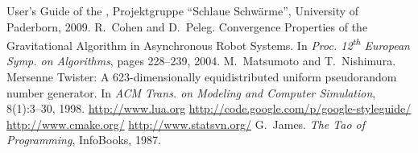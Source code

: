 \begin{thebibliography}{99.}
	User's Guide of the \RSS,
	Projektgruppe ``Schlaue Schwärme'',
	University of Paderborn,
	2009.
	R.~Cohen and D.~Peleg.
        Convergence Properties of the Gravitational Algorithm in Asynchronous Robot Systems.
        In \textit{Proc. 12\textsuperscript{th} European Symp. on Algorithms},
        pages 228--239,
        2004.
	M.~Matsumoto and T.~Nishimura. 
	Mersenne Twister: A 623-dimensionally equidistributed uniform pseudorandom number generator.
	In \textit{ACM Trans. on Modeling and Computer Simulation}, 8(1):3--30, 1998.
	\url{http://www.lua.org}
	\url{http://code.google.com/p/google-styleguide/}
	\url{http://www.cmake.org/}
	\url{http://www.statsvn.org/}
	G.~James.
	\textit{The Tao of Programming}, 
	InfoBooks,
	1987.

\end{thebibliography} 